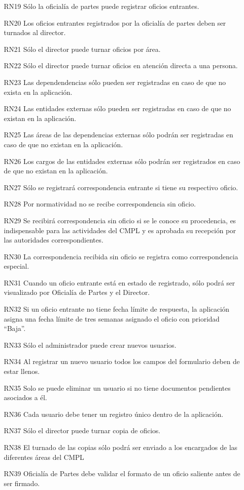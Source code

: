 \begin{itemize}
	\item[RN19] Sólo la oficialía de partes puede registrar oficios entrantes.
	\item[RN20] Los oficios entrantes registrados por la oficialía de partes deben ser turnados al director.
	\item[RN21] Sólo el director puede turnar oficios por área.
	\item[RN22] Sólo el director puede turnar oficios en atención directa a una persona.
	\item[RN23] Las dependendencias sólo pueden ser registradas en caso de que no exista en la aplicación.
	\item[RN24] Las entidades externas sólo pueden ser registradas en caso de que no existan en la aplicación.
	\item[RN25] Las áreas de las dependencias externas sólo podrán ser registradas en caso de que no existan en la aplicación.
	\item[RN26] Los cargos de las entidades externas sólo podrán ser registrados en caso de que no existan en la aplicación.
	\item[RN27] Sólo se registrará correspondencia entrante si tiene su respectivo oficio.
	\item[RN28] Por normatividad no se recibe correspondencia sin oficio.
	\item[RN29] Se recibirá correspondencia sin oficio si se le conoce su procedencia, es indispensable para las actividades del CMPL y es aprobada su recepción por las autoridades correspondientes.
	\item[RN30] La correspondencia recibida sin oficio se registra como correspondencia especial.
	\item[RN31] Cuando un oficio entrante está en estado de registrado, sólo podrá ser visualizado por Oficialía de Partes y el Director.
	\item[RN32] Si un oficio entrante no tiene fecha límite de respuesta, la aplicación asigna una fecha límite de tres semanas asignado el oficio con prioridad “Baja”.
	\item[RN33] Sólo el administrador puede crear nuevos usuarios.
	\item[RN34] Al registrar un nuevo usuario todos los campos del formulario deben de estar llenos.
	\item[RN35] Solo se puede eliminar un usuario si no tiene documentos pendientes asociados a él.
	\item[RN36] Cada usuario debe tener un registro único dentro de la aplicación.
	\item[RN37] Sólo el director puede turnar copia de oficios.
	\item[RN38] El turnado de las copias sólo podrá ser enviado a los encargados de las diferentes áreas del CMPL
	\item[RN39] Oficialía de Partes debe validar el formato de un oficio saliente antes de ser firmado.
\end{itemize}

